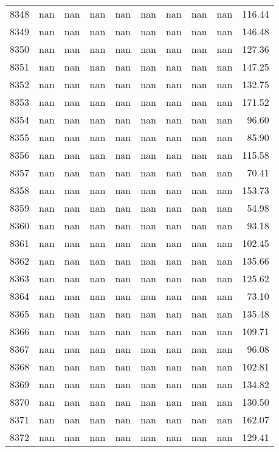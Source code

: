 \begin{tabular}{lrrrrrrrrr}
8348 & nan & nan & nan & nan & nan & nan & nan & nan & 116.44 \\
8349 & nan & nan & nan & nan & nan & nan & nan & nan & 146.48 \\
8350 & nan & nan & nan & nan & nan & nan & nan & nan & 127.36 \\
8351 & nan & nan & nan & nan & nan & nan & nan & nan & 147.25 \\
8352 & nan & nan & nan & nan & nan & nan & nan & nan & 132.75 \\
8353 & nan & nan & nan & nan & nan & nan & nan & nan & 171.52 \\
8354 & nan & nan & nan & nan & nan & nan & nan & nan & 96.60 \\
8355 & nan & nan & nan & nan & nan & nan & nan & nan & 85.90 \\
8356 & nan & nan & nan & nan & nan & nan & nan & nan & 115.58 \\
8357 & nan & nan & nan & nan & nan & nan & nan & nan & 70.41 \\
8358 & nan & nan & nan & nan & nan & nan & nan & nan & 153.73 \\
8359 & nan & nan & nan & nan & nan & nan & nan & nan & 54.98 \\
8360 & nan & nan & nan & nan & nan & nan & nan & nan & 93.18 \\
8361 & nan & nan & nan & nan & nan & nan & nan & nan & 102.45 \\
8362 & nan & nan & nan & nan & nan & nan & nan & nan & 135.66 \\
8363 & nan & nan & nan & nan & nan & nan & nan & nan & 125.62 \\
8364 & nan & nan & nan & nan & nan & nan & nan & nan & 73.10 \\
8365 & nan & nan & nan & nan & nan & nan & nan & nan & 135.48 \\
8366 & nan & nan & nan & nan & nan & nan & nan & nan & 109.71 \\
8367 & nan & nan & nan & nan & nan & nan & nan & nan & 96.08 \\
8368 & nan & nan & nan & nan & nan & nan & nan & nan & 102.81 \\
8369 & nan & nan & nan & nan & nan & nan & nan & nan & 134.82 \\
8370 & nan & nan & nan & nan & nan & nan & nan & nan & 130.50 \\
8371 & nan & nan & nan & nan & nan & nan & nan & nan & 162.07 \\
8372 & nan & nan & nan & nan & nan & nan & nan & nan & 129.41 \\

\end{tabular}
